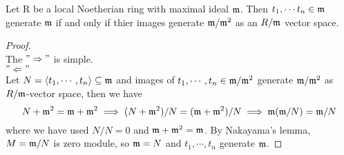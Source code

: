 \begin{prop} \label{local-neotherian-ring-set-gen-max-gen-qoetient-max}
  Let R be a local Noetherian ring with maximal ideal $\mathfrak{m}$. Then $t_1, \cdots t_n
  \in \mathfrak{m}$ generate $\mathfrak{m}$ if and only if thier images generate $\mathfrak{m} / \mathfrak{m}^2$ as an
  $R/\mathfrak{m}$ vector space.
  \begin{proof} $ $ \\
    The $"\Rightarrow"$ is simple. \\
    $"\Leftarrow"$ \\
    Let $N = \langle t_1, \cdots , t_n\rangle \subseteq \mathfrak{m}$ and images of $t_1, \cdots, t_n
    \in \mathfrak{m} / \mathfrak{m}^2$ generate $\mathfrak{m} / \mathfrak{m}^2$ as $R/\mathfrak{m}$-vector space, then we have
    $$
      N+\mathfrak{m}^2 = \mathfrak{m} + \mathfrak{m}^2 \implies (N + \mathfrak{m}^2) / N = (\mathfrak{m} + \mathfrak{m}^2) / N
      \implies \mathfrak{m}(\mathfrak{m}/N) = \mathfrak{m} / N
    $$
    where we have used $N/N = 0$ and $\mathfrak{m} + \mathfrak{m}^2 = \mathfrak{m}$. By Nakayama's lemma, $M =
     \mathfrak{m} / N$ is zero module, so $\mathfrak{m} = N$ and $t_1, \cdots, t_n$ generate $\mathfrak{m}$.
  \end{proof}
\end{prop}
\fi

